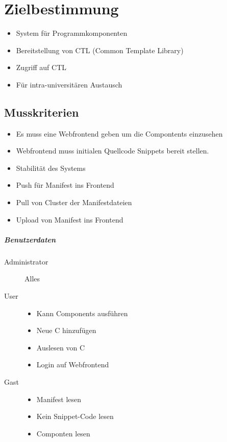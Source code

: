 
\chapter{Zielbestimmung}

\begin{itemize}
\item  System für Programmkomponenten
\item  Bereitstellung von CTL (Common Template Library)
\item  Zugriff auf CTL
\item  Für intra-universitären Austausch
\end{itemize}

\section{Musskriterien}

\begin{itemize}
\item  Es muss eine Webfrontend geben um die Compontents einzusehen
\item  Webfrontend muss initialen Quellcode Snippets bereit stellen.
\item  Stabilität des Systems
\item  Push für Manifest ins Frontend
\item  Pull von Cluster der Manifestdateien
\item  Upload von Manifest ins Frontend
\end{itemize}

\paragraph{Benutzerdaten}

\begin{description}
	\item[Administrator] Alles
	\item[User]
		\begin{itemize}
			\item Kann Components ausführen
			\item Neue C hinzufügen
			\item Auslesen von C
			\item Login auf Webfrontend
		\end{itemize}
	\item[Gast] 
		\begin{itemize}
			\item Manifest lesen
			\item Kein Snippet-Code lesen
			\item Componten lesen
		\end{itemize}
\end{description}

